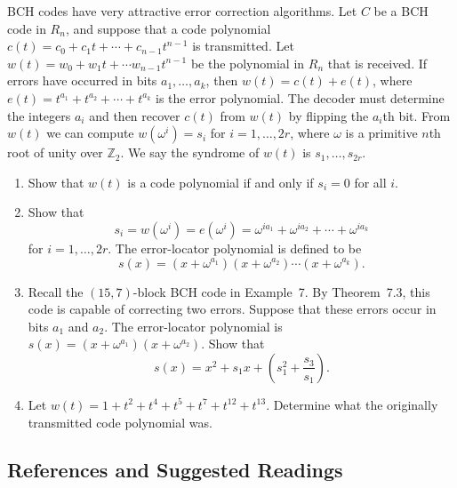 {\small
BCH codes have very attractive error correction algorithms. Let $C$ be
a BCH code in $R_n$, and suppose that a code polynomial $c(t) = c_0 +
c_1 t + \cdots + c_{n-1} t^{n-1}$ is transmitted. Let $w(t) = w_0 +
w_1 t + \cdots w_{n-1} t^{n-1}$ be the polynomial in $R_n$ that is
received.  If errors have occurred in bits $a_1, \ldots, a_k$, then
$w(t) = c(t) + e(t)$, where $e(t) = t^{a_1} + t^{a_2} + \cdots +
t^{a_k}$ is the {\bfi error polynomial}. The
decoder must determine the integers $a_i$ and then recover $c(t)$ from
$w(t)$ by flipping the $a_i$th bit. From $w(t)$ we can compute
$w( \omega^i ) = s_i$ for $i = 1, \ldots, 2r$, where $\omega$ is a
primitive $n$th root of unity over ${\mathbb Z}_2$. We say the {\bfi
syndrome\/} of $w(t)$ is $s_1, \ldots,
s_{2r}$. 
\begin{enumerate}

\item
Show that $w(t)$ is a code polynomial if and only if $s_i = 0$ for all
$i$. 

\item
Show that 
\[
s_i = w( \omega^i) = e( \omega^i) = \omega^{i a_1} + \omega^{i a_2} +
\cdots + \omega^{i a_k} 
\]
for $i = 1, \ldots, 2r$. The {\bfi error-locator
polynomial\/} is defined to be 
\[
s(x) = (x + \omega^{a_1})(x + \omega^{a_2}) \cdots  (x +
\omega^{a_k}). 
\]

\item
Recall the $(15,7)$-block BCH code in Example~7.  By Theorem~7.3, this
code is capable of correcting two errors. Suppose that these errors
occur in bits $a_1$ and $a_2$. The error-locator polynomial
is $s(x) = (x + \omega^{a_1})(x + \omega^{a_2})$. Show that
\[
s(x) = x^2 + s_1 x + \left( s_1^2 + \frac{s_3}{s_1} \right).
\]


\item
Let $w(t) = 1 + t^2 +t^4 + t^5 + t^7 + t^{12} + t^{13}$. Determine
what the originally transmitted code polynomial was.

\end{enumerate}


}



\subsection*{References and Suggested Readings}
 


